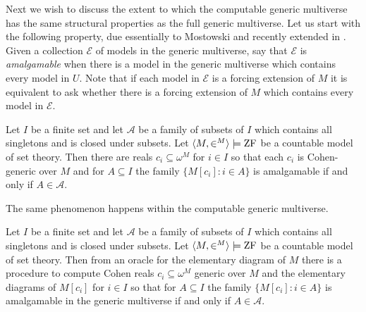 \documentclass{amsart}
\begin{document}
Next we wish to discuss the extent to which the computable generic multiverse has the same structural properties as the full generic multiverse. Let us start with the following property, due essentially to Mostowski \cite{Mostowski1976} and recently extended in \cite{HHKVW2019}. Given a collection $\mathcal E$ of models in the generic multiverse, say that $\mathcal E$ is \emph{amalgamable} when there is a model in the generic multiverse which contains every model in $U$. Note that if each model in $\mathcal E$ is a forcing extension of $M$ it is equivalent to ask whether there is a forcing extension of $M$ which contains every model in $\mathcal E$.

\begin{theorem}[Mostowski]
Let $I$ be a finite set and let $\mathcal A$ be a family of subsets of $I$ which contains all singletons and is closed under subsets. Let $\<M,\in^M>\satisfies\ZF$ be a countable  model of set theory. Then there are reals $c_i \subseteq \omega^M$ for $i \in I$ so that each $c_i$ is Cohen-generic over $M$ and for $A \subseteq I$ the family $\{M[c_i] : i \in A\}$ is amalgamable if and only if $A \in \mathcal A$.
\end{theorem}

The same phenomenon happens within the computable generic multiverse.

\begin{theorem}
Let $I$ be a finite set and let $\mathcal A$ be a family of subsets of $I$ which contains all singletons and is closed under subsets. Let $\<M,\in^M>\satisfies\ZF$ be a countable model of set theory. Then from an oracle for the elementary diagram of $M$ there is a procedure to compute Cohen reals $c_i \subseteq \omega^M$ generic over $M$ and the elementary diagrams of $M[c_i]$ for $i \in I$ so that for $A \subseteq I$ the family $\{M[c_i] : i \in A\}$ is amalgamable in the generic multiverse if and only if $A \in \mathcal A$.
\end{theorem}
\end{document}
